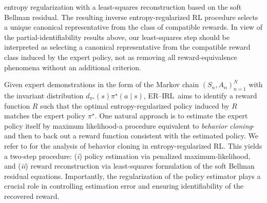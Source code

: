 \documentclass{article}
\theoremstyle{definition}
\theoremstyle{remark}
\theoremstyle{plain}
\newcommand{\ERIRL}{\textsc{ER--IRL}}
\numberwithin{equation}{section}
\begin{document}
entropy regularization with a least-squares reconstruction based on the
soft Bellman residual. The resulting inverse entropy-regularized RL
procedure selects a unique canonical representative from the class of
compatible rewards. In view of the partial-identifiability results above, our least-squares step should be interpreted as selecting a canonical representative from the compatible reward class induced by the expert policy, not as removing all reward-equivalence phenomena without an additional criterion.
\par
Given expert demonstrations in the form of the Markov chain $(S_n,A_n)_{n=1}^N$ with the invariant
distribution $d_{\pi^\star}(s)\pi^\star(a \mid s)$, \ERIRL\, aims to identify a reward 
function $R$ such that the optimal entropy-regularized policy induced by $R$ 
matches the expert policy $\pi^\star$. One natural approach is to estimate the expert 
policy itself by maximum likelihood-a procedure equivalent to \emph{behavior cloning}-and 
then to back out a reward function consistent with the estimated policy. We refer to \cite{TiapkinBelomestny2024} for the analysis of behavior cloning in entropy-regularized RL. This 
yields a two-step procedure: (\emph{i}) policy estimation via penalized 
maximum-likelihood, and (\emph{ii}) reward reconstruction via least-squares formulation of the soft Bellman residual equations. Importantly, the 
regularization of the policy estimator plays a crucial role in controlling 
estimation error and ensuring identifiability of the recovered reward.
\par
\end{document}
